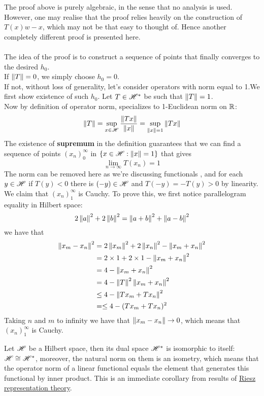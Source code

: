 \begin{remark}\rm\nextline
	The proof above is purely algebraic, in the sense that no analysis is used. However, one may realise that the proof relies heavily on the construction of $T(x)w-x$, which may not be that easy to thought of. Hence another completely different proof is presented here. \\
	\pf\\
	The idea of the proof is to construct a sequence of points that finally converges to the desired $h_0$.\\
	If $\left\|{T}\right\|=0$, we simply choose $h_0=0$.\\
	If not, without loss of generality, let's consider operators with norm equal to 1.We first show existence of such $h_0$. Let $T\in\mathscr{H}^*$ be such that $\left\|{T}\right\|=1$.\\
	Now by definition of operator norm, specializes to 1-Euclidean norm on $\mathbb{R}$:
	$$
		\left\|{T}\right\|=\sup_{x\in\mathscr{H}}\frac{\left\|{Tx}\right\|}{\left\|{x}\right\|} =\sup_{\left\|{x}\right\|=1}\left\|{Tx}\right\|
	$$
	The existence of {\bf supremum} in the definition guarantees that we can find a sequence of points $(x_n)_0^\infty$ in $\{x\in\mathscr{H}:\left\|{x}\right\|=1\}$ that gives
	$$
		\lim_{n\to\infty}{T(x_n)}=1
	$$
	The norm can be removed here as we're discussing functionals , and for each $y\in\mathscr{H}$ if $T(y)<0$ there is $(-y)\in\mathscr{H}$ and $T(-y)=-T(y)>0$ by linearity.\\
	We claim that $(x_n)_1^\infty$ is Cauchy. To prove this, we first notice  parallelogram equality in Hilbert space:
	$$
		2\left\|{a}\right\|^2+2\left\|{b}\right\|^2=\left\|{a+b}\right\|^2+\left\|{a-b}\right\|^2
	$$
	we have that
	\begin{equation}
		\begin{split}
			\left\|{x_m-x_n}\right\|^2&=2\left\|{x_m}\right\|^2+2\left\|{x_n}\right\|^2-\left\|{x_m+x_n}\right\|^2\\
			&=2\times1+2\times1-\left\|{x_m+x_n}\right\|^2\\
			&=4-\left\|{x_m+x_n}\right\|^2\\
			&=4-\left\|{T}\right\|^2\left\|{x_m+x_n}\right\|^2\\
			&\leq4-\left\|{Tx_m+Tx_n}\right\|^2\\
			&=\leq4-(Tx_m+Tx_n)^2
		\end{split}
	\end{equation}
	Taking $n$ and $m$ to infinity we have that $\left\|{x_m-x_n}\right\|\to 0$, which means that $(x_n)_1^\infty$ is Cauchy.
\end{remark}
\begin{theorem}\label{dual space Hilbert}\rm\nextline
	Let $\mathscr{H}$ be a Hilbert space, then its dual space $\mathscr{H}^*$ is isomorphic to  itself: $\mathscr{H}\cong\mathscr{H}^*$, moreover, the natural norm on them is an isometry, which means that the operator norm of a linear functional equals the element that generates this functional by inner product. This is an immediate corollary from results of \hyperref[Riesz representation theory]{Riesz representation theory}.
\end{theorem}

